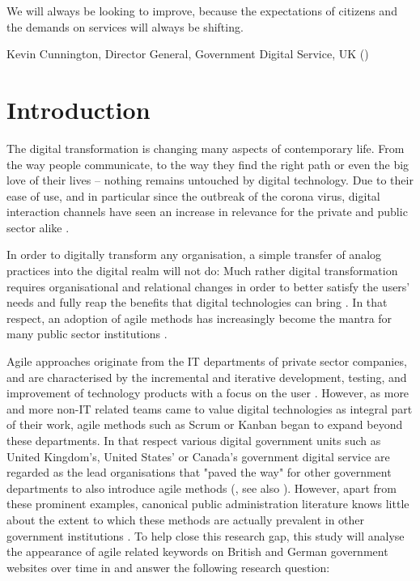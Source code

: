 
\setlength{\epigraphwidth}{0.5\textwidth}
\epigraph{We will always be looking to improve, because the expectations of citizens and the demands on services will always be shifting.}{Kevin Cunnington, Director General, Government Digital Service, UK (\cite*{Cunnington2017})}

\section{Introduction}
\label{Introduction}
The digital transformation is changing many aspects of contemporary life. From the way people communicate, to the way they find the right path or even the big love of their lives – nothing remains untouched by digital technology. Due to their ease of use, and in particular since the outbreak of the corona virus, digital interaction channels have seen an increase in relevance for the private and public sector alike \parencite{Koeze2020, WorldEconomicForum2020}.

In order to digitally transform any organisation, a simple transfer of analog practices into the digital realm will not do: Much rather digital transformation requires organisational and relational changes in order to better satisfy the users' needs and fully reap the benefits that digital technologies can bring \parencite{Mergel2019a}. In that respect, an adoption of agile methods has increasingly become the mantra for many public sector institutions \parencite{Lundqvist2016, Vacari2015, Mergel}. 

Agile approaches originate from the IT departments of private sector companies, and are characterised by the incremental and iterative development, testing, and improvement of technology products with a focus on the user \parencite{Mergel2016}. However, as more and more non-IT related teams came to value digital technologies as integral part of their work, agile methods such as Scrum or Kanban began to expand beyond these departments. In that respect various digital government units such as United Kingdom's, United States' or Canada's government digital service are regarded as the lead organisations that "paved the way" for other government departments to also introduce agile methods (\cite[2]{Mergel}, see also \cite{Clarke2019}). However, apart from these prominent examples, canonical public administration literature knows little about the extent to which these methods are actually prevalent in other government institutions \parencite{CarvalhoFernandes2016, Vacari2015, Mergel2018, Mergel}. To help close this research gap, this study will analyse the appearance of agile related keywords on British and German government websites over time in and answer the following research question:

